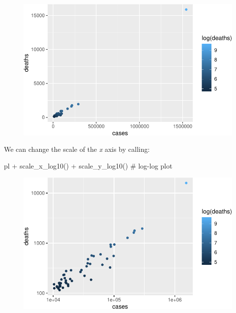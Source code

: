 \documentclass[
  letterpaper,
  DIV=11,
  numbers=noendperiod]{scrreprt}
\newenvironment{Shaded}{\begin{snugshade}}{\end{snugshade}}
\newcommand{\CommentTok}[1]{\textcolor[rgb]{0.37,0.37,0.37}{#1}}
\newcommand{\FunctionTok}[1]{\textcolor[rgb]{0.28,0.35,0.67}{#1}}
\newcommand{\NormalTok}[1]{\textcolor[rgb]{0.00,0.23,0.31}{#1}}
\newcommand{\SpecialCharTok}[1]{\textcolor[rgb]{0.37,0.37,0.37}{#1}}
\begin{document}
\begin{figure}[H]

{\centering \includegraphics{./01-dataviz_files/figure-pdf/unnamed-chunk-18-1.pdf}

}

\end{figure}

We can change the scale of the \emph{x} axis by calling:

\begin{Shaded}
\begin{Highlighting}[]
\NormalTok{pl }\SpecialCharTok{+} \FunctionTok{scale\_x\_log10}\NormalTok{() }\SpecialCharTok{+} \FunctionTok{scale\_y\_log10}\NormalTok{() }\CommentTok{\# log{-}log plot}
\end{Highlighting}
\end{Shaded}

\begin{figure}[H]

{\centering \includegraphics{./01-dataviz_files/figure-pdf/unnamed-chunk-19-1.pdf}

}

\end{figure}
\end{document}
